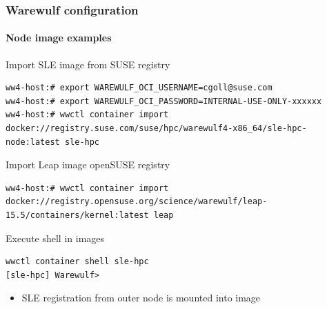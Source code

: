\documentclass[aspectratio=169]{beamer}
\begin{document}
\begin{frame}[fragile]
\frametitle{Warewulf configuration}
\framesubtitle{Node image examples}
\begin{block}{Import SLE image from SUSE registry}
\begin{lstlisting}[style=wwctl]
ww4-host:# export WAREWULF_OCI_USERNAME=cgoll@suse.com
ww4-host:# export WAREWULF_OCI_PASSWORD=INTERNAL-USE-ONLY-xxxxxx
ww4-host:# wwctl container import docker://registry.suse.com/suse/hpc/warewulf4-x86_64/sle-hpc-node:latest sle-hpc
\end{lstlisting}
\end{block}
\begin{block}{Import Leap image openSUSE registry}
\begin{lstlisting}[style=wwctl]
ww4-host:# wwctl container import docker://registry.opensuse.org/science/warewulf/leap-15.5/containers/kernel:latest leap
\end{lstlisting}
\end{block}
\begin{block}{Execute shell in images}
\begin{lstlisting}[style=wwctl]
wwctl container shell sle-hpc
[sle-hpc] Warewulf>
\end{lstlisting}
\begin{itemize}
  \item SLE registration from outer node is mounted into image
\end{itemize}
\end{block}
\end{frame}
\end{document}
